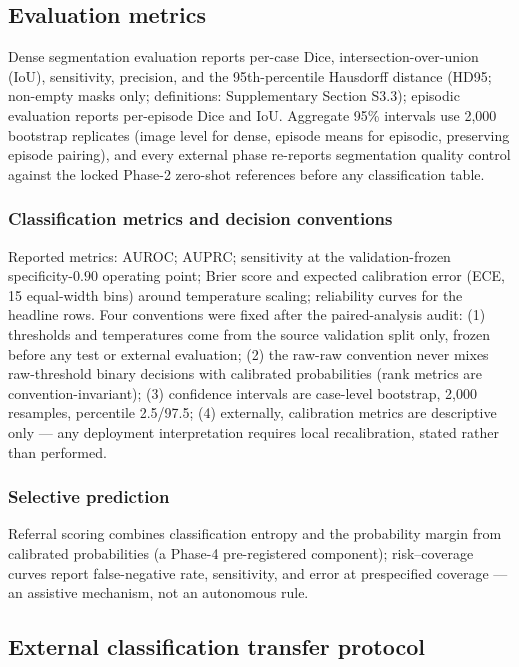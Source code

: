 \documentclass[jimh,article,submit,moreauthors,pdftex]{Definitions/tsp}
\begin{document}
\subsection{Evaluation metrics}
\label{subsec:evaluation_metrics}

Dense segmentation evaluation reports per-case Dice,
intersection-over-union (IoU), sensitivity, precision, and the
95th-percentile Hausdorff distance (HD95; non-empty masks only;
definitions: Supplementary Section S3.3); episodic evaluation reports
per-episode Dice and IoU. Aggregate 95\% intervals use 2,000 bootstrap
replicates (image level for dense, episode means for episodic,
preserving episode pairing), and every external phase re-reports
segmentation quality control against the locked Phase-2 zero-shot
references before any classification table.

\subsubsection{Classification metrics and decision conventions}
\label{subsubsec:classification_metrics}

Reported metrics: AUROC; AUPRC; sensitivity at the validation-frozen
specificity-$0.90$ operating point; Brier score and expected
calibration error (ECE, 15 equal-width bins) around temperature
scaling; reliability curves for the headline rows. Four conventions
were fixed after the paired-analysis audit: (1) thresholds and
temperatures come from the source validation split only, frozen before
any test or external evaluation; (2) the raw-raw convention never mixes
raw-threshold binary decisions with calibrated probabilities (rank
metrics are convention-invariant); (3) confidence intervals are
case-level bootstrap, 2,000 resamples, percentile 2.5/97.5; (4)
externally, calibration metrics are descriptive only --- any deployment
interpretation requires local recalibration, stated rather than
performed.

\subsubsection{Selective prediction}

Referral scoring combines classification entropy and the probability
margin from calibrated probabilities (a Phase-4 pre-registered
component); risk--coverage curves report false-negative rate,
sensitivity, and error at prespecified coverage --- an assistive
mechanism, not an autonomous rule.

\subsection{External classification transfer protocol}
\label{subsec:external_classification_protocol}
\end{document}
